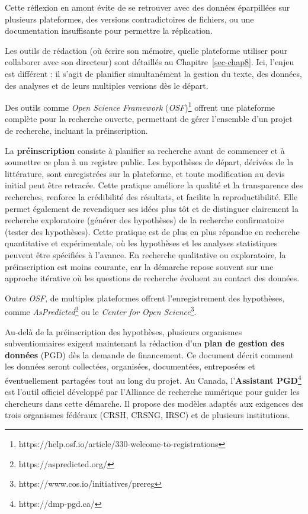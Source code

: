 \documentclass[
  letterpaper,
  DIV=11,
  numbers=noendperiod,
  oneside]{scrreprt}
\begin{document}
Cette réflexion en amont évite de se retrouver avec des données
éparpillées sur plusieurs plateformes, des versions contradictoires de
fichiers, ou une documentation insuffisante pour permettre la
réplication.

Les outils de rédaction (où écrire son mémoire, quelle plateforme
utiliser pour collaborer avec son directeur) sont détaillés au
Chapitre~\ref{sec-chap8}. Ici, l'enjeu est différent : il s'agit de
planifier simultanément la gestion du texte, des données, des analyses
et de leurs multiples versions dès le départ.

Des outils comme \emph{Open Science Framework} (\emph{OSF})\footnote{https://help.osf.io/article/330-welcome-to-registrations}
offrent une plateforme complète pour la recherche ouverte, permettant de
gérer l'ensemble d'un projet de recherche, incluant la préinscription.

La \textbf{préinscription} consiste à planifier sa recherche avant de
commencer et à soumettre ce plan à un registre public. Les hypothèses de
départ, dérivées de la littérature, sont enregistrées sur la plateforme,
et toute modification au devis initial peut être retracée. Cette
pratique améliore la qualité et la transparence des recherches, renforce
la crédibilité des résultats, et facilite la reproductibilité. Elle
permet également de revendiquer ses idées plus tôt et de distinguer
clairement la recherche exploratoire (générer des hypothèses) de la
recherche confirmatoire (tester des hypothèses). Cette pratique est de
plus en plus répandue en recherche quantitative et expérimentale, où les
hypothèses et les analyses statistiques peuvent être spécifiées à
l'avance. En recherche qualitative ou exploratoire, la préinscription
est moins courante, car la démarche repose souvent sur une approche
itérative où les questions de recherche évoluent au contact des données.

Outre \emph{OSF}, de multiples plateformes offrent l'enregistrement des
hypothèses, comme \emph{AsPredicted}\footnote{https://aspredicted.org/}
ou le \emph{Center for Open Science}\footnote{https://www.cos.io/initiatives/prereg}.

Au-delà de la préinscription des hypothèses, plusieurs organismes
subventionnaires exigent maintenant la rédaction d'un \textbf{plan de
gestion des données} (PGD) dès la demande de financement. Ce document
décrit comment les données seront collectées, organisées, documentées,
entreposées et éventuellement partagées tout au long du projet. Au
Canada, l'\textbf{Assistant PGD}\footnote{https://dmp-pgd.ca/} est
l'outil officiel développé par l'Alliance de recherche numérique pour
guider les chercheurs dans cette démarche. Il propose des modèles
adaptés aux exigences des trois organismes fédéraux (CRSH, CRSNG, IRSC)
et de plusieurs institutions.
\end{document}
